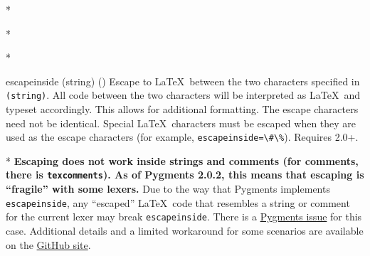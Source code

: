 % 
%  
%  
%  
% 
%  
%  
%  
%  
%   
%  
%  
% 
% 
    



\begin{paracol}{2}


\begin{optionlist}


\switchcolumn[0]*%

    
\switchcolumn

\switchcolumn[0]*%
  

\switchcolumn[0]*%
  \item[escapeinside (string) (\meta{none})]
  Escape to \LaTeX\ between the two characters specified in \texttt{\string(string\string)}.  All code between the two characters will be interpreted as \LaTeX\ and typeset accordingly.  This allows for additional formatting.  The escape characters need not be identical.  Special \LaTeX\ characters must be escaped when they are used as the escape characters (for example, \texttt{escapeinside=\textbackslash\#\textbackslash\%}).  Requires  2.0+.
  \switchcolumn

  \switchcolumn[0]*%
\textbf{Escaping does not work inside strings and comments (for comments, there is \texttt{texcomments}).  As of Pygments 2.0.2, this means that escaping is ``fragile'' with some lexers.}  Due to the way that Pygments implements \texttt{escapeinside}, any ``escaped'' \LaTeX\ code that resembles a string or comment for the current lexer may break \texttt{escapeinside}.  There is a \href{https://bitbucket.org/birkenfeld/pygments-main/issue/1118}{Pygments issue} for this case.  Additional details and a limited workaround for some scenarios are available on the \href{https://github.com/gpoore/minted/issues/70#issuecomment-111729930}{ GitHub site}.
\switchcolumn


\end{optionlist}
\end{paracol}
